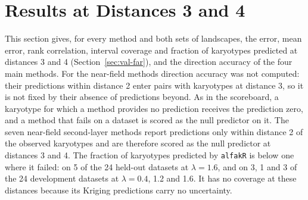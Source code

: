 \documentclass[11pt]{article}
\begin{document}


\section{Results at Distances 3 and 4}
\label{sec:s-far}

This section gives, for every method and both sets of landscapes, the error,
mean error, rank correlation, interval coverage and fraction of karyotypes
predicted at distances 3 and 4 (Section~\ref{sec:val-far}), and the direction
accuracy of the four main methods. For the near-field methods direction
accuracy was not computed: their predictions within distance 2 enter pairs
with karyotypes at distance 3, so it is not fixed by their absence of
predictions beyond. As in the
scoreboard, a karyotype for which a method provides no prediction receives
the prediction zero, and a method that fails on a dataset is scored as the
null predictor on it. The seven near-field second-layer methods report
predictions only within distance 2 of the observed karyotypes and are
therefore scored as the null predictor at distances 3 and 4. The fraction of
karyotypes predicted by \texttt{alfakR} is below one where it failed: on 5 of
the 24 held-out datasets at $\lambda=1.6$, and on 3, 1 and 3 of the 24
development datasets at $\lambda=0.4$, 1.2 and 1.6. It has no coverage at
these distances because its Kriging predictions carry no uncertainty.


\end{document}
